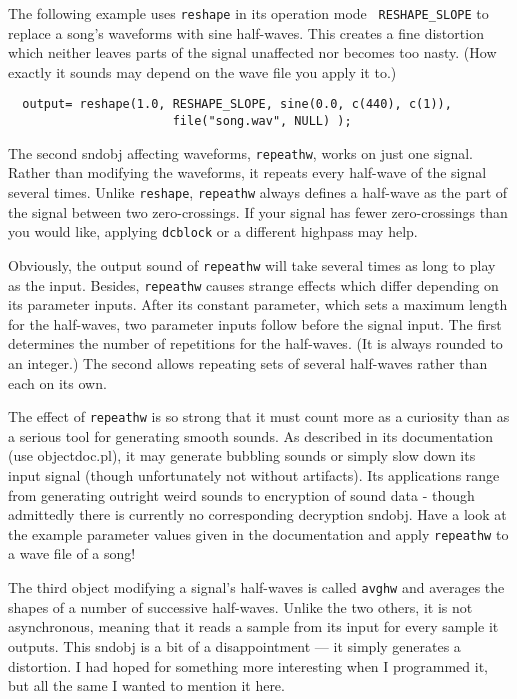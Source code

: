 \documentclass{article}
\def\bv{\begin{verbatim}}
\begin{document}
The following example uses {\tt reshape} in its operation mode {\tt
RESHAPE\_SLOPE} to replace a song's waveforms with sine half-waves.  This
creates a fine distortion which neither leaves parts of the signal unaffected
nor becomes too nasty.  (How exactly it sounds may depend on the wave file you
apply it to.)

\bv
  output= reshape(1.0, RESHAPE_SLOPE, sine(0.0, c(440), c(1)),
                       file("song.wav", NULL) );
\end{verbatim}

The second sndobj affecting waveforms, {\tt repeathw}, works on just one
signal.  Rather than modifying the waveforms, it repeats every half-wave of the
signal several times.  Unlike {\tt reshape}, {\tt repeathw} always defines a
half-wave as the part of the signal between two zero-crossings.  If your signal
has fewer zero-crossings than you would like, applying {\tt dcblock} or a
different highpass may help.

Obviously, the output sound of {\tt repeathw} will take several times as long
to play as the input.  Besides, {\tt repeathw} causes strange effects which
differ depending on its parameter inputs.  After its constant parameter, which
sets a maximum length for the half-waves, two parameter inputs follow before
the signal input.  The first determines the number of repetitions for the
half-waves.  (It is always rounded to an integer.)  The second allows repeating
sets of several half-waves rather than each on its own.

The effect of {\tt repeathw} is so strong that it must count more as a
curiosity than as a serious tool for generating smooth sounds.  As described in
its documentation (use objectdoc.pl), it may generate bubbling sounds or simply
slow down its input signal (though unfortunately not without artifacts).  Its
applications range from generating outright weird sounds to encryption of sound
data - though admittedly there is currently no corresponding decryption sndobj.
Have a look at the example parameter values given in the documentation and
apply {\tt repeathw} to a wave file of a song!

The third object modifying a signal's half-waves is called {\tt avghw} and
averages the shapes of a number of successive half-waves.  Unlike the two
others, it is not asynchronous, meaning that it reads a sample from its input
for every sample it outputs.  This sndobj is a bit of a disappointment --- it
simply generates a distortion.  I had hoped for something more interesting
when I programmed it, but all the same I wanted to mention it here. 
\end{document}
